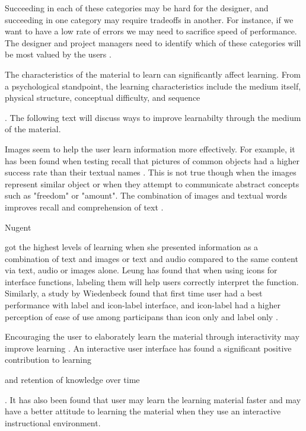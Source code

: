Succeeding in each of these categories may be hard for the designer, and succeeding in one category may require tradeoffs in another. For instance, if we want to have a low rate of errors we may need to sacrifice speed of performance. The designer and project managers need to identify which of these categories will be most valued by the users \cite{Shneiderman2004}.


The characteristics of the material to learn can significantly affect learning. From a psychological standpoint, the learning characteristics include the medium itself, physical structure, conceptual difficulty, and sequence . The following text will discuss ways to improve learnabilty through the medium of the material.

Images seem to help the user learn information more effectively. For example, it has been found when testing recall that pictures of common objects had a higher success rate than their textual names \cite{Lieberman1965} \cite{Nelson1976} \cite{Paivio1969} \cite{Paivio1973}. This is not true though when the images represent similar object \cite{Nelson1976} or when they attempt to communicate abstract concepts such as "freedom" or "amount". The combination of images and textual words improves recall \cite{Paivio1973} and comprehension of text \cite{Levie1982}.

Nugent  got the highest levels of learning when she presented information as a combination of text and images or text and audio compared to the same content via text, audio or images alone. Leung \cite{Leung2009} has found that when using icons for interface functions, labeling them will help users correctly interpret the function. Similarly, a study by Wiedenbeck found that first time user had a best performance with label and icon-label interface, and icon-label had a higher perception of ease of use among participans than icon only and label only \cite{Wiedenbeck1999}.

Encouraging the user to elaborately learn the material through interactivity may improve learning \cite{Bower1970} \cite{Jacoby1979} \cite{Bosco1990}. An interactive user interface has found a significant positive contribution to learning \cite{Bosco1990} \cite{Fletcher1989}  and retention of knowledge over time . It has also been found that user may learn the learning material faster and may have a better attitude to learning the material when they use an interactive instructional environment. 

